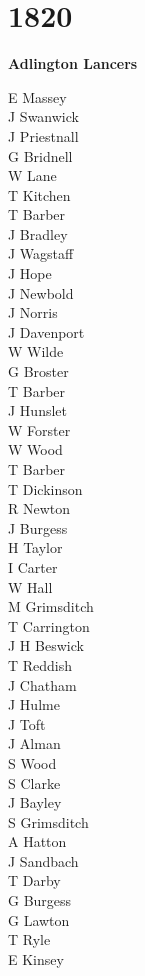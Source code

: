 \chapter*{1820}

\begin{center}
  \Large
  \textbf{Adlington Lancers}
\end{center}

\begin{multicols}{2}
  \noindent
  E Massey \\
  J Swanwick \\
  J Priestnall \\
  G Bridnell \\
  W Lane \\
  T Kitchen \\
  T Barber \\
  J Bradley \\
  J Wagstaff \\
  J Hope \\
  J Newbold \\
  J Norris \\
  J Davenport \\
  W Wilde \\
  G Broster \\
  T Barber \\
  J Hunslet \\
  W Forster \\
  W Wood \\
  T Barber \\
  T Dickinson \\
  R Newton \\
  J Burgess \\
  H Taylor \\
  I Carter \\
  W Hall \\
  M Grimsditch \\
  T Carrington \\
  J H Beswick \\
  T Reddish \\
  J Chatham \\
  J Hulme \\
  J Toft \\
  J Alman \\
  S Wood \\
  S Clarke \\
  J Bayley \\
  S Grimsditch \\
  A Hatton \\
  J Sandbach \\
  T Darby \\
  G Burgess \\
  G Lawton \\
  T Ryle \\
  E Kinsey \\
\end{multicols}
